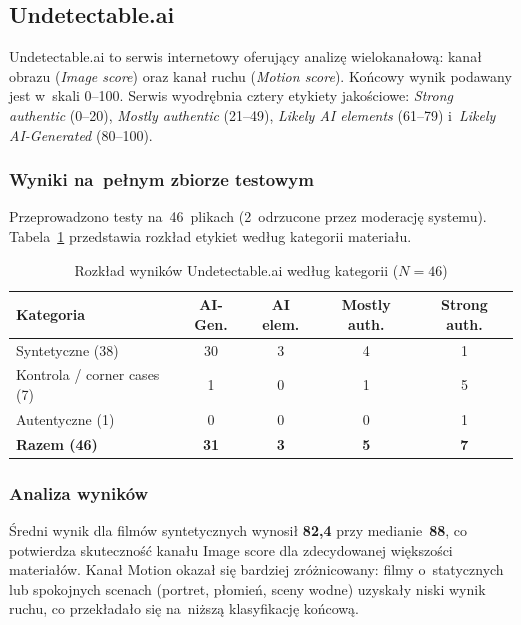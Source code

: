 \subsection{Undetectable.ai}
\label{sec:undetectable}

Undetectable.ai to serwis internetowy oferuj\k{a}cy analiz\k{e} wielokana\l{}ow\k{a}:
kana\l{} obrazu (\emph{Image score}) oraz kana\l{} ruchu (\emph{Motion score}).
Ko\'{n}cowy wynik podawany jest w~skali 0--100.
Serwis wyodr\k{e}bnia cztery etykiety jako\'{s}ciowe:
\emph{Strong authentic} (0--20),
\emph{Mostly authentic} (21--49),
\emph{Likely AI elements} (61--79)
i~\emph{Likely AI-Generated} (80--100).

\subsubsection{Wyniki na~pe\l{}nym zbiorze testowym}

Przeprowadzono testy na~46~plikach (2~odrzucone przez moderacj\k{e} systemu).
Tabela~\ref{tab:undetectable_summary} przedstawia rozk\l{}ad etykiet
wed\l{}ug kategorii materia\l{}u.

\begin{table}[htbp]
\centering
{\setlength{\tabcolsep}{7pt}\renewcommand{\arraystretch}{1.3}
\caption{Rozk\l{}ad wynik\'{o}w Undetectable.ai wed\l{}ug kategorii ($N=46$)}
\label{tab:undetectable_summary}
\small
\begin{tabular}{lcccc}
\toprule
\textbf{Kategoria} &
\textbf{AI-Gen.} &
\textbf{AI elem.} &
\textbf{Mostly auth.} &
\textbf{Strong auth.} \\
\midrule
Syntetyczne (38)              & 30 & 3 & 4 & 1 \\
Kontrola / corner cases (7)   &  1 & 0 & 1 & 5 \\
Autentyczne (1)               &  0 & 0 & 0 & 1 \\
\midrule
\textbf{Razem (46)} & \textbf{31} & \textbf{3} & \textbf{5} & \textbf{7} \\
\bottomrule
\end{tabular}}
\end{table}

\subsubsection{Analiza wynik\'{o}w}

\'{S}redni wynik dla film\'{o}w syntetycznych wynosi\l{} \textbf{82{,}4}
przy medianie~\textbf{88}, co potwierdza skuteczno\'{s}\'{c}
kana\l{}u Image score dla zdecydowanej wi\k{e}kszo\'{s}ci materia\l{}\'{o}w.
Kana\l{} Motion okaza\l{} si\k{e} bardziej zr\'{o}\.{z}nicowany:
filmy o~statycznych lub spokojnych scenach (portret, p\l{}omie\'{n},
sceny wodne) uzyska\l{}y niski wynik ruchu, co przek\l{}ada\l{}o si\k{e}
na~ni\.{z}sz\k{a} klasyfikacj\k{e} ko\'{n}cow\k{a}.

